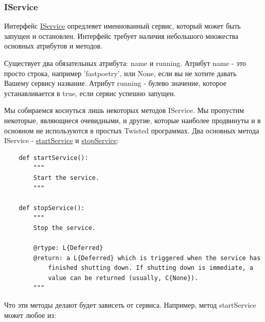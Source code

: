 \subsubsection{IService}


Интерфейс 
\href{http://twistedmatrix.com/trac/browser/tags/releases/twisted-10.0.0/twisted/application/service.py#L87}{IService} опредлеяет именнованный сервис, 
который может быть запущен и остановлен. 
Интерфейс требует наличия небольшого 
множества основных атрибутов и методов.


Существует два обязательных атрибута: name и running. 
Атрибут name - это просто строка, например 'fastpoetry', или 
None, если вы не хотите давать Вашему сервису название. 
Атрибут running - булево значение, которое устанавливается в true, 
если сервис успешно запущен.


Мы собираемся коснуться лишь некоторых методов IService. 
Мы пропустим некоторые, являющиеся очевидными, и другие, которые 
наиболее продвинуты и в основном не используются в простых 
Twisted программах. Два основных метода IService - 
\href{http://twistedmatrix.com/trac/browser/tags/releases/twisted-10.0.0/twisted/application/service.py#L130}{startService} и 
\href{http://twistedmatrix.com/trac/browser/tags/releases/twisted-10.0.0/twisted/application/service.py#L135}{stopService}:

\begin{scriptsize}\begin{verbatim}
    def startService():
        """
        Start the service.
        """

    def stopService():
        """
        Stop the service.

        @rtype: L{Deferred}
        @return: a L{Deferred} which is triggered when the service has
            finished shutting down. If shutting down is immediate, a
            value can be returned (usually, C{None}).
        """

\end{verbatim}\end{scriptsize}

Что эти методы делают будет зависеть от сервиса. Например, 
метод startService может любое из:

